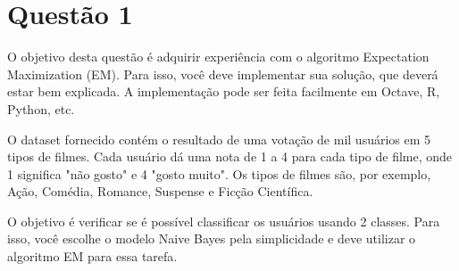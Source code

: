 \section*{Questão 1}

O objetivo desta questão é adquirir experiência com o algoritmo Expectation Maximization (EM). Para isso, você deve implementar sua solução, que deverá estar bem explicada. A implementação pode ser feita facilmente em Octave, R, Python, etc.

O dataset fornecido contém o resultado de uma votação de mil usuários em 5 tipos de filmes. Cada usuário dá uma nota de 1 a 4 para cada tipo de filme, onde 1 significa "não gosto" e 4 "gosto muito". Os tipos de filmes são, por exemplo, Ação, Comédia, Romance, Suspense e Ficção Científica.

O objetivo é verificar se é possível classificar os usuários usando 2 classes. Para isso, você escolhe o modelo Naive Bayes pela simplicidade e deve utilizar o algoritmo EM para essa tarefa.

